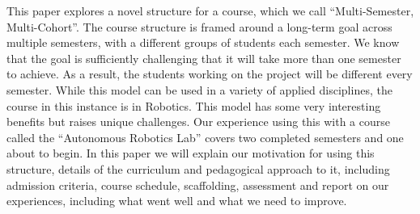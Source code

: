 This paper explores a novel structure for a course, which we call ``Multi-Semester, Multi-Cohort''. The course structure is framed around a long-term goal across multiple semesters, with a different groups of students each semester. We know that the goal is sufficiently challenging that it will take more than one semester to achieve. As a result, the students working on the project will be different every semester. While this model can be used in a variety of applied disciplines, the course in this instance is in Robotics. This model has some very interesting benefits but raises unique challenges. Our experience using this with a course called the ``Autonomous Robotics Lab'' covers two completed semesters and one about to begin. In this paper we will explain our motivation for using this structure, details of the curriculum and pedagogical approach to it, including admission criteria, course schedule, scaffolding, assessment and report on our experiences, including what went well and what we need to improve.
